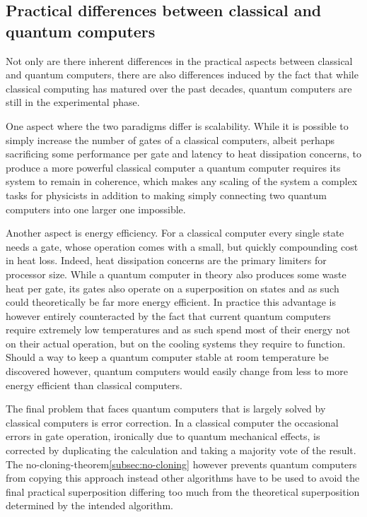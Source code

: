 \subsection{Practical differences between classical and quantum computers} \label{subsec:diffclassquantpracticey}
Not only are there inherent differences in the practical aspects between classical and quantum computers, there are also
differences induced by the fact that while classical computing has matured over the past decades, quantum computers are
still in the experimental phase.

One aspect where the two paradigms differ is scalability.
While it is possible to simply increase the number of gates of a classical computers, albeit perhaps sacrificing some
performance per gate and latency to heat dissipation concerns, to produce a more powerful classical computer a quantum
computer requires its system to remain in coherence\cite{find explaination}, which makes any scaling of the system a
complex tasks for physicists in addition to making simply connecting two quantum computers into one larger one impossible.

Another aspect is energy efficiency.
For a classical computer every single state needs a gate, whose operation comes with a small, but quickly compounding
cost in heat loss.
Indeed, heat dissipation concerns are the primary limiters for processor size.
While a quantum computer in theory also produces some waste heat per gate, its gates also operate on a superposition on
states and as such could theoretically be far more energy efficient.
In practice this advantage is however entirely counteracted by the fact that current quantum computers require extremely
low temperatures and as such spend most of their energy not on their actual operation, but on the cooling systems they
require to function.
Should a way to keep a quantum computer stable at room temperature be discovered however, quantum computers would easily
change from less to more energy efficient than classical computers.

The final problem that faces quantum computers that is largely solved by classical computers is error correction.
In a classical computer the occasional errors in gate operation, ironically due to quantum mechanical effects, is
corrected by duplicating the calculation and taking a majority vote of the result.
The no-cloning-theorem\ref{subsec:no-cloning} however prevents quantum computers from copying this approach instead
other algorithms have to be used to avoid the final practical superposition differing too much from the theoretical
superposition determined by the intended algorithm. %

